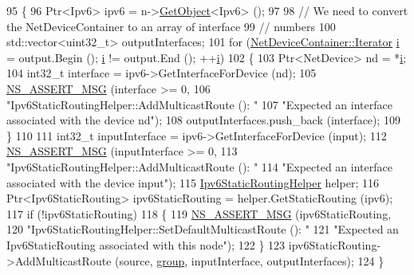 \begin{DoxyCode}
95 \{
96   Ptr<Ipv6> ipv6 = n->\hyperlink{classns3_1_1Object_a13e18c00017096c8381eb651d5bd0783}{GetObject}<Ipv6> ();
97 
98   \textcolor{comment}{// We need to convert the NetDeviceContainer to an array of interface }
99   \textcolor{comment}{// numbers}
100   std::vector<uint32\_t> outputInterfaces;
101   \textcolor{keywordflow}{for} (\hyperlink{classns3_1_1NetDeviceContainer_a45709bb572f975569ed985fa89b132f8}{NetDeviceContainer::Iterator} \hyperlink{bernuolliDistribution_8m_a6f6ccfcf58b31cb6412107d9d5281426}{i} = output.Begin (); 
      \hyperlink{bernuolliDistribution_8m_a6f6ccfcf58b31cb6412107d9d5281426}{i} != output.End (); ++\hyperlink{bernuolliDistribution_8m_a6f6ccfcf58b31cb6412107d9d5281426}{i})
102     \{
103       Ptr<NetDevice> nd = *\hyperlink{bernuolliDistribution_8m_a6f6ccfcf58b31cb6412107d9d5281426}{i};
104       int32\_t \textcolor{keyword}{interface }= ipv6->GetInterfaceForDevice (nd);
105       \hyperlink{assert_8h_aff5ece9066c74e681e74999856f08539}{NS\_ASSERT\_MSG} (interface >= 0, 
106                      \textcolor{stringliteral}{"Ipv6StaticRoutingHelper::AddMulticastRoute (): "}
107                      \textcolor{stringliteral}{"Expected an interface associated with the device nd"});
108       outputInterfaces.push\_back (interface);
109     \}
110 
111   int32\_t inputInterface = ipv6->GetInterfaceForDevice (input);
112   \hyperlink{assert_8h_aff5ece9066c74e681e74999856f08539}{NS\_ASSERT\_MSG} (inputInterface >= 0, 
113                  \textcolor{stringliteral}{"Ipv6StaticRoutingHelper::AddMulticastRoute (): "}
114                  \textcolor{stringliteral}{"Expected an interface associated with the device input"});
115   \hyperlink{classns3_1_1Ipv6StaticRoutingHelper_ae72254093470eae64213505e1a17c567}{Ipv6StaticRoutingHelper} helper;
116   Ptr<Ipv6StaticRouting> ipv6StaticRouting = helper.GetStaticRouting (ipv6);
117   \textcolor{keywordflow}{if} (!ipv6StaticRouting)
118     \{
119       \hyperlink{assert_8h_aff5ece9066c74e681e74999856f08539}{NS\_ASSERT\_MSG} (ipv6StaticRouting,
120                      \textcolor{stringliteral}{"Ipv6StaticRoutingHelper::SetDefaultMulticastRoute (): "}
121                      \textcolor{stringliteral}{"Expected an Ipv6StaticRouting associated with this node"});
122     \}
123   ipv6StaticRouting->AddMulticastRoute (source, \hyperlink{namespacevisualizer_1_1higcontainer_aa6ad2b76790275bfce7783429beaa23f}{group}, inputInterface, outputInterfaces);
124 \}
\end{DoxyCode}


